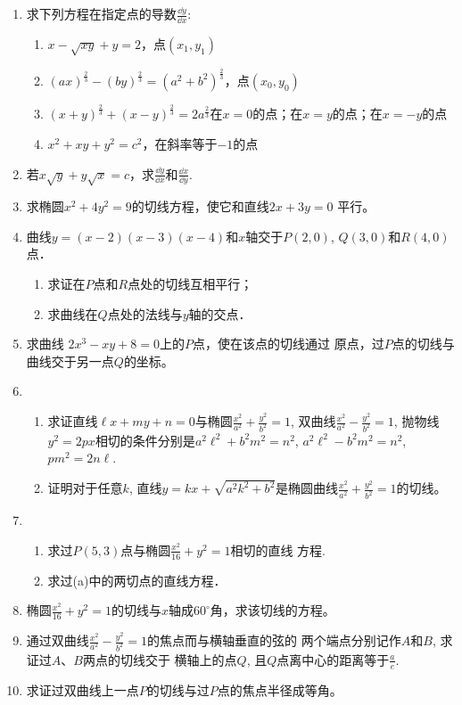 \begin{ex}
\begin{enumerate}
\item 求下列方程在指定点的导数$\frac{\dd y}{\dd x}$:
\begin{enumerate}
    \item $x-\sqrt{xy}+y=2$，点$(x_1,y_1)$
    \item $(ax)^{\tfrac{2}{3}}-(by)^{\tfrac{2}{3}}=(a^2+b^2)^{\tfrac{2}{3}}$，点$(x_0,y_0)$
    \item $(x+y)^{\tfrac{2}{3}}+(x-y)^{\tfrac{2}{3}}=2a^{\tfrac{2}{3}}$在$x=0$的点；在$x=y$的点；在$x=-y$的点
    \item $x^2+xy+y^2=c^2$，在斜率等于$-1$的点
\end{enumerate}
\item 若$x\sqrt{y}+y\sqrt{x}=c$，求$\frac{\dd y}{\dd x}$和$\frac{\dd x}{\dd y}$.
\item 求椭圆$x^2+4y^2=9$的切线方程，使它和直线$2x+3y=0$
平行。
\item 曲线$y=(x-2)(x-3)(x-4)$和$x$轴交于$P(2, 0)$, $Q(3,0)$和$R(4, 0)$点．
\begin{enumerate}
    \item 求证在$P$点和$R$点处的切线互相平行；
    \item 求曲线在$Q$点处的法线与$y$轴的交点．
\end{enumerate}
\item 求曲线 $2x^3-xy+8=0$上的$P$点，使在该点的切线通过
原点，过$P$点的切线与曲线交于另一点$Q$的坐标。
\item \begin{enumerate}
    \item 求证直线$\ell x +my+n=0$与椭圆$\frac{x^2}{a^2}+\frac{y^2}{b^2}=1$, 双曲线$\frac{x^2}{a^2}-\frac{y^2}{b^2}=1$, 抛物线$y^2=2px$相切的条件分别是$a^2\ell^2+b^2m^2=n^2$, $a^2\ell^2-b^2m^2=n^2$, $pm^2=2n\ell$.
    \item 证明对于任意$k$, 直线$y=kx+\sqrt{a^2k^2+b^2}$是椭圆曲线$\frac{x^2}{a^2}+\frac{y^2}{b^2}=1$的切线。    
\end{enumerate}
\item \begin{enumerate}
    \item 求过$P(5, 3)$点与椭圆$\frac{x^2}{16}+{y^2}=1$相切的直线
    方程.
    \item 求过(a)中的两切点的直线方程．
\end{enumerate}

\item 椭圆$\frac{x^2}{16}+{y^2}=1$的切线与$x$轴成$60^{\circ}$角，求该切线的方程。
\item 通过双曲线$\frac{x^2}{a^2}-\frac{y^2}{b^2}=1$的焦点而与横轴垂直的弦的
两个端点分别记作$A$和$B$, 求证过$A$、$B$两点的切线交于
横轴上的点$Q$, 且$Q$点离中心的距离等于$\frac{a}{e}$.
\item 求证过双曲线上一点$P$的切线与过$P$点的焦点半径成等角。
\end{enumerate}
\end{ex}

